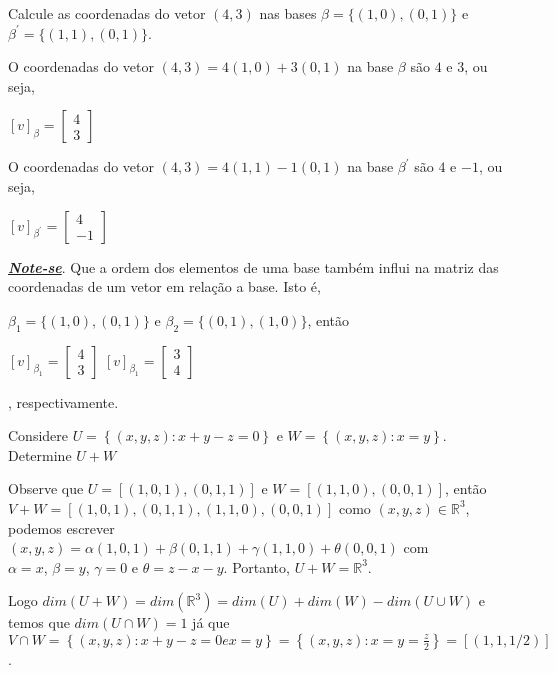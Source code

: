 \begin{ex}
	Calcule as coordenadas do vetor $(4,3)$ nas bases $\beta=\{(1,0),(0,1)\}$ e $\beta^{'}=\{(1,1),(0,1)\}$.
\end{ex}
O coordenadas do vetor $(4,3)=4(1,0)+3(0,1)$ na base $\beta$ são $4$ e $3$, ou seja, 
\begin{center}
	$[v]_{\beta}=\begin{bmatrix}
	4\\
	3
	\end{bmatrix}$
\end{center} 
O coordenadas do vetor $(4,3)=4(1,1)-1(0,1)$ na base $\beta^{'}$ são $4$ e $-1$, ou seja, 
\begin{center}
	$[v]_{\beta^{'}}=\begin{bmatrix}
	4\\
	-1
	\end{bmatrix}$
\end{center} 
\underline{\textit{\textbf{Note-se}}}. Que a ordem dos elementos de uma base também influi na matriz das coordenadas de um vetor em relação a base. Isto é,

$\beta_{1}=\{(1,0),(0,1)\}$ e $\beta_{2}=\{(0,1),(1,0)\}$, então 
 \begin{center}
	$[v]_{\beta_{1}}=\begin{bmatrix}
	4\\
	3
	\end{bmatrix}$ \quad\quad {}\quad\quad 
		$[v]_{\beta_{1}}=\begin{bmatrix}
	3\\
	4
	\end{bmatrix}$
\end{center}, respectivamente.
\begin{ex}
Considere $U=\left\lbrace (x,y,z): x+y-z=0 \right\rbrace $ e $W=\left\lbrace (x,y,z):x=y \right\rbrace $. Determine $U+W$
\end{ex}
Observe que $U=[(1,0,1),(0,1,1)]$ e $W=[(1,1,0),(0,0,1)]$, então \\
$V+W=[(1,0,1),(0,1,1),(1,1,0),(0,0,1)]$ como $(x,y,z)\in \mathbb{R}^{3}$, podemos escrever\\ $(x,y,z)=\alpha(1,0,1)+\beta(0,1,1)+\gamma(1,1,0)+\theta(0,0,1)$ com\\ $\alpha=x$, $\beta=y$, $\gamma=0$ e $\theta=z-x-y$. Portanto, $U+W=\mathbb{R}^{3}$. 

Logo $dim(U+W)=dim(\mathbb{R}^{3})=dim(U)+dim(W)-dim(U\cup W)$ e temos que $dim(U\cap W)=1$ já que $V\cap W=\left\lbrace (x,y,z): x+y-z=0 e x=y \right\rbrace=\left\lbrace (x,y,z): x=y=\frac{z}{2} \right\rbrace =[(1,1,1/2)]$.


